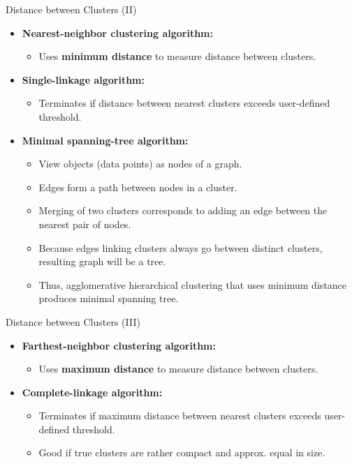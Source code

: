 \begin{frame}{Distance between Clusters (II)}
	\begin{itemize}
		\item \textbf{Nearest-neighbor clustering algorithm:}
		\begin{itemize}
			\item Uses \textbf{\color{airforceblue}minimum distance} to measure 
			distance between clusters.
		\end{itemize}
		\item \textbf{Single-linkage algorithm:}
		\begin{itemize}
			\item Terminates if distance between nearest clusters exceeds 
			user-defined threshold.
		\end{itemize}
		\item \textbf{Minimal spanning-tree algorithm:}
		\begin{itemize}
			\item View objects (data points) as nodes of a graph.
			\item Edges form a path between nodes in a cluster.
			\item Merging of two clusters corresponds to adding an edge between 
			the nearest pair of nodes.
			\item Because edges linking clusters always go between distinct 
			clusters,\\
			resulting graph will be a tree.
			\item Thus, agglomerative hierarchical clustering that uses minimum 
			distance produces minimal spanning tree.
		\end{itemize}
	\end{itemize}
\end{frame}

\begin{frame}{Distance between Clusters (III)}
	\begin{itemize}
		\item \textbf{Farthest-neighbor clustering algorithm:}
		\begin{itemize}
			\item Uses \textbf{\color{airforceblue}maximum distance} to measure 
			distance between clusters.
		\end{itemize}
		\item \textbf{Complete-linkage algorithm:}
		\begin{itemize}
			\item Terminates if maximum distance between nearest clusters 
			exceeds user-defined threshold.
			\item Good if true clusters are rather compact and approx. equal in 
			size.
		\end{itemize}
	\end{itemize}
\end{frame}

